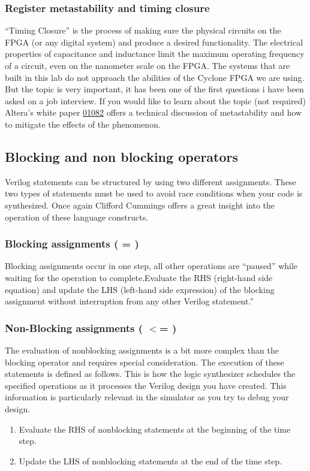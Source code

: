     \subsubsection{Register metastability and timing closure}
      ``Timing Closure'' is the process of making sure the physical circuits on the FPGA (or any digital system) and produce a desired functionality. The electrical properties of capacitance and inductance limit the maximum operating frequency of a circuit, even on the nanometer scale on the FPGA. The systems that are built in this lab do not approach the abilities of the Cyclone FPGA we are using. But the topic is very important, it has been one of the first questions i have been asked on a job interview. If you would like to learn about the topic (not required) Altera's white paper \href{http://www.altera.com/literature/wp/wp-01082-quartus-ii-metastability.pdf}{01082} offers a technical discussion of metastability and how to mitigate the effects of the phenomenon.

  \subsection{Blocking and non blocking operators}
    Verilog statements can be structured by using two different assignments. These two types of statements must be used to avoid race conditions when your code is synthesized. Once again Clifford Cummings offers a great insight into the operation of these language constructs. 
      
    \subsubsection{Blocking assignments \bfseries ( = )} 
      Blocking assignments occur in one step, all other operations are ``paused'' while waiting for the operation to complete.Evaluate the RHS (right-hand side equation) and update the LHS (left-hand side expression) of the blocking assignment without interruption from any other Verilog statement.''\cite{Sunburst:BlockNoBlock}

    \subsubsection{Non-Blocking assignments \bfseries ( $<$= )} 
      The evaluation of nonblocking assignments is a bit more complex than the blocking operator and requires special consideration. The execution of these statements is defined as follows. This is how the logic synthesizer schedules the specified operations as it processes the Verilog design you have created. This information is particularly relevant in the simulator as you try to debug your design. 
      \begin{enumerate}
        \item Evaluate the RHS of nonblocking statements at the beginning of the time step.
        \item Update the LHS of nonblocking statements at the end of the time step.
      \end{enumerate}
      \cite{Sunburst:BlockNoBlock}

